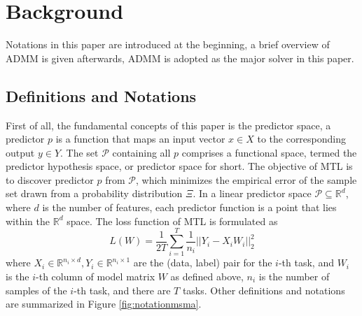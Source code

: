 \documentclass[twoside,leqno,twocolumn]{article}
\begin{document}
\section{Background}
Notations in this paper are introduced at the beginning, a brief overview of ADMM is given afterwards, ADMM is adopted as the major solver in this paper.

\subsection{Definitions and Notations}
First of all, the fundamental concepts of this paper is the predictor space, a predictor $p$ is a function
that maps an input vector $x\in X$ to the corresponding
output $y\in Y$. The set $\mathcal{P}$ containing
all $p$ comprises a functional space, termed the predictor hypothesis
space, or predictor space for short. The objective of MTL is to discover predictor $p$ from $\mathcal{P}$, which minimizes the empirical error
of the sample set drawn from a probability distribution $\Xi$. In
a linear predictor space $\mathcal{P}\subseteq\mathbb{R}^{d}$, where
$d$ is the number of features, each predictor function is a point
that lies within the $\mathbb{R}^{d}$ space. 
The loss function of MTL is formulated as \cite{mtl:kdd2011:ChenLY10} 
%
\vskip -0.5cm
\begin{equation}
L(W)=\frac{1}{2T}\sum\limits _{i=1}^{T}{\frac{1}{{n_{i}}}||{Y_{i}}-{X_{i}}W_{i}||_{2}^{2}}
\end{equation}
%
where ${X_i} \in {\mathbb{R}^{{n_i} \times d}},{Y_i} \in {\mathbb{R}^{{n_i} \times 1}}$ are the (data, label) pair for the $i$-th task, and
$W_{i}$ is the $i$-th column of model matrix $W$ as defined above,
$n_{i}$ is the number of samples of the $i$-th task, and there are $T$ tasks.
Other definitions
and notations are summarized in Figure \ref{fig:notationmsma}.
%
\end{document}
